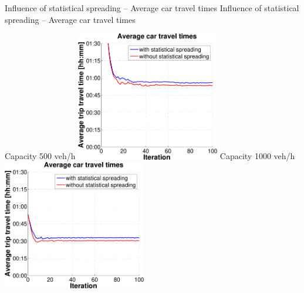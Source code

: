 \createfigure%
{Influence of statistical spreading -- Average car travel times}%
{Influence of statistical spreading -- Average car travel times}%
{\label{fig:statisticalSpreadingAvgCarTravelTimes}}%
{%
  \createsubfigure%
  {Capacity 500 veh/h}%
  {\includegraphics[width=0.47\textwidth, angle=0, trim=0mm 0mm 0mm 9mm, clip=true]{extending/figures/MultiModalSimulation/simulations/avg_car_traveltime_scatter_500}}%
  {\label{}}%
  {\hspace{3mm}}%
  \createsubfigure%
  {Capacity 1000 veh/h}%
  {\includegraphics[width=0.47\textwidth, angle=0, trim=0mm 0mm 0mm 9mm, clip=true]{extending/figures/MultiModalSimulation/simulations/avg_car_traveltime_scatter_1000}}%
  {\label{}}%
  {\vspace{7.5mm}}%

}
